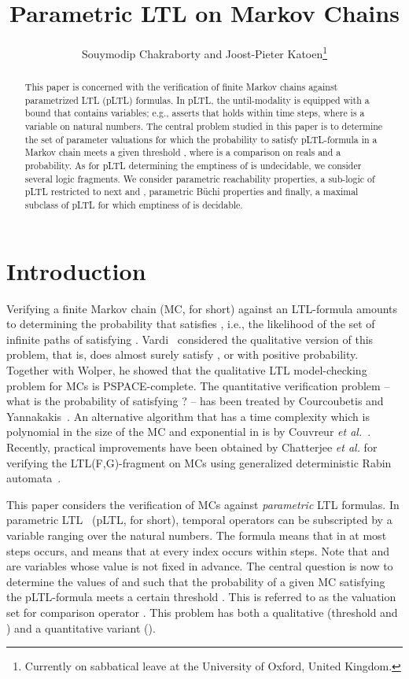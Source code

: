 \documentclass{llncs}
\title{Parametric LTL on Markov Chains}
\author{Souymodip Chakraborty and Joost-Pieter Katoen\thanks{Currently on sabbatical leave at the University of Oxford, United Kingdom.}}
\institute{RWTH Aachen University, Ahornstra\ss{}e 55, D-52074 Aachen, Germany}
\begin{document}
 \maketitle

\begin{abstract}
This paper is concerned with the verification of finite Markov chains against parametrized LTL (pLTL) formulas.
In pLTL, the until-modality is equipped with a bound that contains variables; e.g.,  asserts that  holds within  
time steps, where  is a variable on natural numbers.
The central problem studied in this paper is to determine the set of parameter valuations  for which the probability to satisfy pLTL-formula 
 in a Markov chain meets 
a given threshold , where  is a comparison on reals and  a probability.
As for pLTL determining the emptiness of  is undecidable, we consider several logic fragments.
We consider parametric reachability properties, 
a sub-logic of pLTL restricted to next and , 
parametric B\"uchi properties and finally, a maximal subclass of pLTL for which emptiness of  is decidable.
\end{abstract}

\section{Introduction} 
Verifying a finite Markov chain (MC, for short)  against an LTL-formula  amounts to determining the probability that  satisfies , i.e., 
the likelihood of the set of  infinite paths of  satisfying .
Vardi~\cite{DBLP:conf/focs/Vardi85} considered the qualitative version of this problem, that is, does  almost surely satisfy , or with positive probability.
Together with Wolper, he showed that the qualitative LTL model-checking problem for MCs is PSPACE-complete.
The quantitative verification problem -- what is the probability of satisfying ? -- has been treated by Courcoubetis and 
Yannakakis~\cite{DBLP:journals/jacm/CourcoubetisY95}.
An alternative algorithm that has a time complexity which is polynomial in the size of the MC and exponential in  is by 
Couvreur \emph{et al.}~\cite{CouvreurSahebSutre03}.
Recently, practical improvements have been obtained by Chatterjee \emph{et al.} for verifying the LTL(F,G)-fragment on MCs using generalized deterministic Rabin automata~\cite{DBLP:conf/cav/ChatterjeeGK13}.


This paper considers the verification of MCs against \emph{parametric} LTL formulas.
In parametric LTL~\cite{DBLP:journals/tocl/AlurETP01} (pLTL, for short), temporal operators can be subscripted by a variable ranging over the natural numbers.
The formula  means that in at most  steps  occurs, and  means that at every
index  occurs within  steps. 
Note that  and  are variables whose value is not fixed in advance.
The central question is now to determine the values of  and  such that the probability of a given MC satisfying the pLTL-formula  meets a certain 
threshold .
This is referred to as the valuation set  for comparison operator .
This problem has both a qualitative (threshold  and ) and a quantitative variant ().
\end{document}
